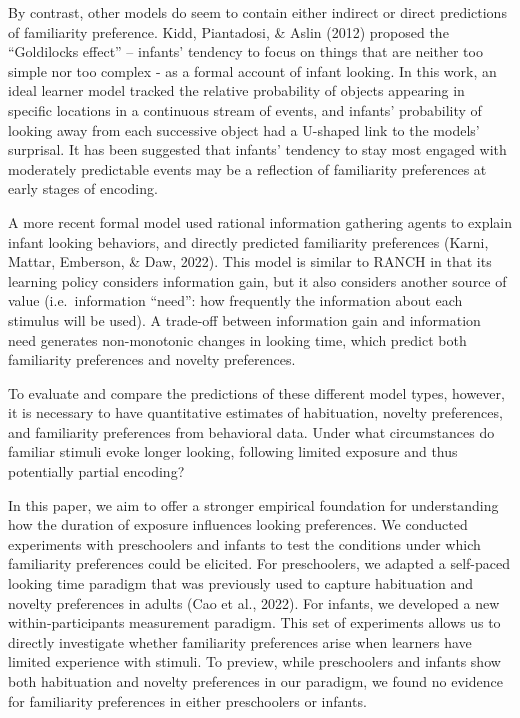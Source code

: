 \documentclass[10pt, letterpaper]{article}
\begin{document}
By contrast, other models do seem to contain either indirect or direct
predictions of familiarity preference. Kidd, Piantadosi, \& Aslin (2012)
proposed the ``Goldilocks effect'' -- infants' tendency to focus on
things that are neither too simple nor too complex - as a formal account
of infant looking. In this work, an ideal learner model tracked the
relative probability of objects appearing in specific locations in a
continuous stream of events, and infants' probability of looking away
from each successive object had a U-shaped link to the models'
surprisal. It has been suggested that infants' tendency to stay most
engaged with moderately predictable events may be a reflection of
familiarity preferences at early stages of encoding.

A more recent formal model used rational information gathering agents to
explain infant looking behaviors, and directly predicted familiarity
preferences (Karni, Mattar, Emberson, \& Daw, 2022). This model is
similar to RANCH in that its learning policy considers information gain,
but it also considers another source of value (i.e.~information
``need'': how frequently the information about each stimulus will be
used). A trade-off between information gain and information need
generates non-monotonic changes in looking time, which predict both
familiarity preferences and novelty preferences.

To evaluate and compare the predictions of these different model types,
however, it is necessary to have quantitative estimates of habituation,
novelty preferences, and familiarity preferences from behavioral data.
Under what circumstances do familiar stimuli evoke longer looking,
following limited exposure and thus potentially partial encoding?

In this paper, we aim to offer a stronger empirical foundation for
understanding how the duration of exposure influences looking
preferences. We conducted experiments with preschoolers and infants to
test the conditions under which familiarity preferences could be
elicited. For preschoolers, we adapted a self-paced looking time
paradigm that was previously used to capture habituation and novelty
preferences in adults (Cao et al., 2022). For infants, we developed a
new within-participants measurement paradigm. This set of experiments
allows us to directly investigate whether familiarity preferences arise
when learners have limited experience with stimuli. To preview, while
preschoolers and infants show both habituation and novelty preferences
in our paradigm, we found no evidence for familiarity preferences in
either preschoolers or infants.
\end{document}
